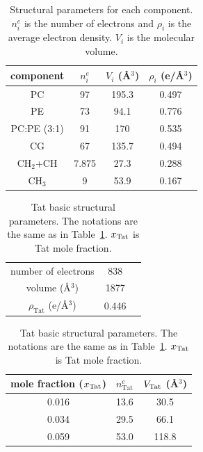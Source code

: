 \begin{table}[htbp]
  \centering
  \begin{tabular}{cccc}
    \hline
    component & $n^e_i$ & $V_i$ (\AA$^3$) & $\rho_i$ (e/\AA$^3$) \\
    \hline 
    PC & 97 & 195.3 & 0.497 \\  
    PE & 73 & 94.1  & 0.776 \\
    PC:PE (3:1) & 91 & 170 & 0.535 \\
    CG & 67 & 135.7 & 0.494 \\  
    CH$_2$+CH & 7.875 & 27.3 & 0.288 \\
    CH$_3$ & 9 & 53.9 & 0.167 \\
    \hline
  \end{tabular}
  \caption[Structural parameters for each component]
  {Structural parameters for each component.   $n^e_i$ is the number of 
  electrons and $\rho_i$ is the average electron density. $V_i$ is the 
  molecular volume.}
  \label{tab:component}
\end{table}

\begin{table}[htbp]
  \centering
  \begin{tabular}{c c c}
    \hline
    number of electrons & 838 \\ 
    volume (\AA$^3$) & 1877 \\
    $\rho_\textrm{Tat}$ (e/\AA$^3$) & 0.446 \\
    \hline
  \end{tabular}
  \quad
  \begin{tabular}{ ccc }
    \hline
    mole fraction ($x_\textrm{Tat}$) & $n^e_\textrm{Tat}$ & $V_\textrm{Tat}$ (\AA$^3$) \\    
    \hline
    0.016 & 13.6 & 30.5 \\
    0.034 & 29.5 & 66.1 \\
    0.059 & 53.0 & 118.8 \\
    \hline
  \end{tabular}
  \caption[Tat basic structural parameters]
  {Tat basic structural parameters. The notations are the same
  as in Table~\ref{tab:component}. $x_\textrm{Tat}$ is Tat mole fraction.}
  \label{tab:Tat_basic_params}
\end{table}

